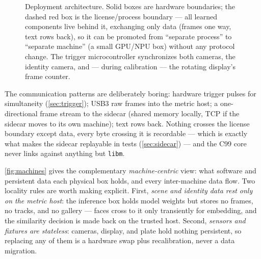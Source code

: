 \documentclass[11pt]{article}
\theoremstyle{definition}
\newcommand{\code}[1]{\texttt{#1}}
\begin{document}
\begin{figure}[ht]
{}
\caption{Deployment architecture. Solid boxes are hardware boundaries;
the dashed red box is the license/process boundary --- all learned
components live behind it, exchanging only data (frames one way,
text rows back), so it can be promoted from ``separate process'' to
``separate machine'' (a small GPU/NPU box) without any protocol change.
The trigger microcontroller synchronizes both cameras, the identity
camera, and --- during calibration --- the rotating display's frame
counter.}
\label{fig:deploy}
\end{figure}

The communication patterns are deliberately boring: hardware trigger
pulses for simultaneity (\autoref{sec:trigger}); USB3 raw frames into
the metric host; a one-directional frame stream to the sidecar (shared
memory locally, TCP if the sidecar moves to its own machine); text rows
back. Nothing crosses the license boundary except data, every byte
crossing it is recordable --- which is exactly what makes the sidecar
replayable in tests (\autoref{sec:sidecar}) --- and the C99 core never
links against anything but \code{libm}.

\autoref{fig:machines} gives the complementary \emph{machine-centric}
view: what software and persistent data each physical box holds, and
every inter-machine data flow. Two locality rules are worth making
explicit. First, \emph{scene and identity data rest only on the metric
host}: the inference box holds model weights but stores no frames, no
tracks, and no gallery --- faces cross to it only transiently for
embedding, and the similarity decision is made back on the trusted host.
Second, \emph{sensors and fixtures are stateless}: cameras, display, and
plate hold nothing persistent, so replacing any of them is a hardware
swap plus recalibration, never a data migration.
\end{document}
